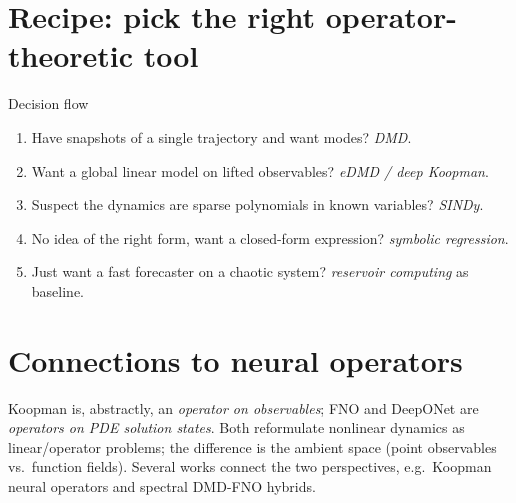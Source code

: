 \section{Recipe: pick the right operator-theoretic tool}
\begin{recipe}{Decision flow}
\begin{enumerate}
\item Have snapshots of a single trajectory and want modes? \emph{DMD}.
\item Want a global linear model on lifted observables? \emph{eDMD /
deep Koopman}.
\item Suspect the dynamics are sparse polynomials in known variables?
\emph{SINDy}.
\item No idea of the right form, want a closed-form expression?
\emph{symbolic regression}.
\item Just want a fast forecaster on a chaotic system? \emph{reservoir
computing} as baseline.
\end{enumerate}
\end{recipe}

\section{Connections to neural operators}
Koopman is, abstractly, an \emph{operator on observables}; FNO and
DeepONet are \emph{operators on PDE solution states}. Both reformulate
nonlinear dynamics as linear/operator problems; the difference is the
ambient space (point observables vs.\ function fields). Several works
connect the two perspectives, e.g.\ Koopman neural operators and
spectral DMD-FNO hybrids.
